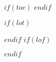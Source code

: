 \singlespacing
$if(toc)$
\tableofcontents
$endif$

\begingroup
\setlength{\parskip}{1\baselineskip}
$if(lot)$
\listoftables
$endif$
\newpage
$if(lof)$
\listoffigures
$endif$
\newpage
\newpage
\endgroup

\normalsize
\doublespacing
{}
\setcounter{page}{1}
